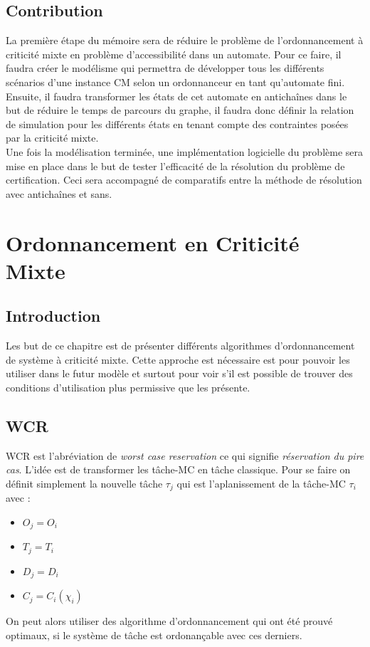 \documentclass[a4paper]{report}
\theoremstyle{break}
\theoremstyle{breakplain}
\begin{document}
\section{Contribution}

La première étape du mémoire sera de réduire le problème de l'ordonnancement à criticité mixte en problème d'accessibilité dans un automate. Pour ce faire, il faudra créer le modélisme qui permettra de développer tous les différents scénarios d'une instance CM selon un ordonnanceur en tant qu'automate fini.\\

Ensuite, il faudra transformer les états de cet automate en antichaînes dans le but de réduire le temps de parcours du graphe, il faudra donc définir la relation de simulation pour les différents états en tenant compte des contraintes posées par la criticité mixte.\\

Une fois la modélisation terminée, une implémentation logicielle du problème sera mise en place dans le but de tester l'efficacité de la résolution du problème de certification. Ceci sera accompagné de comparatifs entre la méthode de résolution avec antichaînes et sans.


\chapter{Ordonnancement en Criticité Mixte}
\section{Introduction}
Les but de ce chapitre est de présenter différents algorithmes d'ordonnancement de système à criticité mixte. Cette approche est nécessaire est pour pouvoir les utiliser dans le futur modèle et surtout pour voir s'il est possible de trouver des conditions d'utilisation plus permissive que les présente.

\section{WCR}
WCR est l'abréviation de \textit{worst case reservation} ce qui signifie \textit{réservation du pire cas}. L'idée est de transformer les tâche-MC en tâche classique. Pour se faire on définit simplement la nouvelle tâche $\tau_j$ qui est l'aplanissement de la tâche-MC $\tau_i$ avec :
\begin{itemize}
\item $O_j = O_i$
\item $T_j = T_i$
\item $D_j = D_i$
\item $C_j = C_i(\chi_i)$
\end{itemize}
On peut alors utiliser des algorithme d'ordonnancement qui ont été prouvé optimaux\cite{goossens2014os}, si le système de tâche est ordonançable avec ces derniers.
\end{document}
